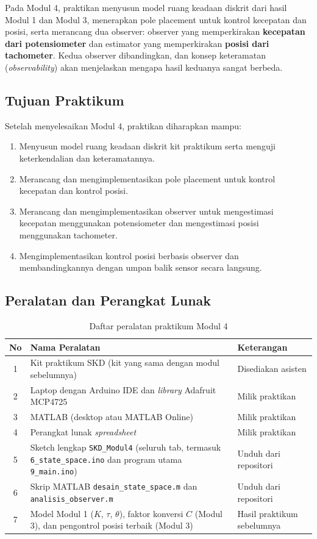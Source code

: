 \documentclass[11pt,a4paper]{article}
\newcommand{\prog}[1]{\texttt{#1}}
\begin{document}
Pada Modul 4, praktikan menyusun model ruang keadaan diskrit dari hasil Modul 1 dan Modul 3, menerapkan pole placement untuk kontrol kecepatan dan posisi, serta merancang dua observer: observer yang memperkirakan \textbf{kecepatan dari potensiometer} dan estimator yang memperkirakan \textbf{posisi dari tachometer}. Kedua observer dibandingkan, dan konsep keteramatan (\textit{observability}) akan menjelaskan mengapa hasil keduanya sangat berbeda.

\subsection{Tujuan Praktikum}
Setelah menyelesaikan Modul 4, praktikan diharapkan mampu:
\begin{enumerate}
\item Menyusun model ruang keadaan diskrit kit praktikum serta menguji keterkendalian dan keteramatannya.
\item Merancang dan mengimplementasikan pole placement untuk kontrol kecepatan dan kontrol posisi.
\item Merancang dan mengimplementasikan observer untuk mengestimasi kecepatan menggunakan potensiometer dan mengestimasi posisi menggunakan tachometer.
\item Mengimplementasikan kontrol posisi berbasis observer dan membandingkannya dengan umpan balik sensor secara langsung.
\end{enumerate}

\subsection{Peralatan dan Perangkat Lunak}
\begin{table}[H]
\centering
\caption{Daftar peralatan praktikum Modul 4}
\label{tab:peralatan}
\begin{tabularx}{\textwidth}{|c|X|l|}
\hline
\textbf{No} & \textbf{Nama Peralatan} & \textbf{Keterangan} \\
\hline
1 & Kit praktikum SKD (kit yang sama dengan modul sebelumnya) & Disediakan asisten \\
2 & Laptop dengan Arduino IDE dan \textit{library} Adafruit MCP4725 & Milik praktikan \\
3 & MATLAB (desktop atau MATLAB Online) & Milik praktikan \\
4 & Perangkat lunak \textit{spreadsheet} & Milik praktikan \\
5 & Sketch lengkap \prog{SKD\_Modul4} (seluruh tab, termasuk \prog{6\_state\_space.ino} dan program utama \prog{9\_main.ino}) & Unduh dari repositori \\
6 & Skrip MATLAB \prog{desain\_state\_space.m} dan \prog{analisis\_observer.m} & Unduh dari repositori \\
7 & Model Modul 1 ($K$, $\tau$, $\theta$), faktor konversi $C$ (Modul 3), dan pengontrol posisi terbaik (Modul 3) & Hasil praktikum sebelumnya \\
\hline
\end{tabularx}
\end{table}
\end{document}
